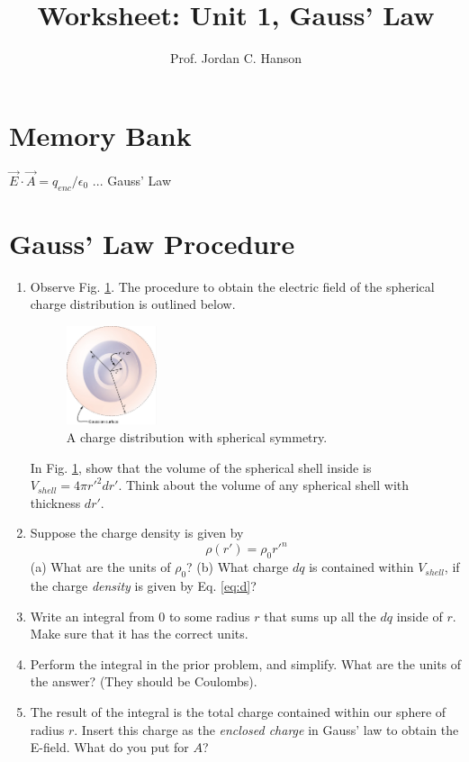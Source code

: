 \documentclass{article}
\begin{document}
\title{Worksheet: Unit 1, Gauss' Law}
\author{Prof. Jordan C. Hanson}

\maketitle

\section{Memory Bank}

$\vec{E} \cdot \vec{A} = q_{enc}/\epsilon_0$ ... Gauss' Law

\section{Gauss' Law Procedure}

\begin{enumerate}
\item Observe Fig. \ref{fig:spheres4}.  The procedure to obtain the electric field of the spherical charge distribution is outlined below.
\begin{figure}[ht]
\centering
\includegraphics[width=0.25\textwidth]{figures/spheres4.png}
\caption{\label{fig:spheres4} A charge distribution with spherical symmetry.}
\end{figure}
In Fig. \ref{fig:spheres4}, show that the volume of the spherical shell inside is $V_{shell} = 4\pi r'^2 dr'$.  Think about the volume of any spherical shell with thickness $dr'$. \\ \vspace{0.5cm}
\item Suppose the charge density is given by
\begin{equation}
\rho(r') = \rho_0 r'^n \label{eq:d}
\end{equation}
(a) What are the units of $\rho_0$? (b) What charge $dq$ is contained within $V_{shell}$, if the charge \textit{density} is given by Eq. \ref{eq:d}? \\ \vspace{1cm}
\item Write an integral from $0$ to some radius $r$ that sums up all the $dq$ inside of $r$. Make sure that it has the correct units.  \\ \vspace{1cm}
\item Perform the integral in the prior problem, and simplify.  What are the units of the answer?  (They should be Coulombs). \\ \vspace{1cm}
\item The result of the integral is the total charge contained within our sphere of radius $r$.  Insert this charge as the \textit{enclosed charge} in Gauss' law to obtain the E-field.  What do you put for $A$?
\end{enumerate}
\end{document}
